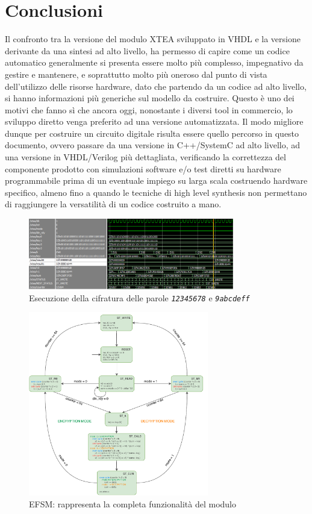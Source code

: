\documentclass[]{IEEEtran}
\newcommand{\code}[1]{\texttt{#1}}
\begin{document}
\section{Conclusioni}
Il confronto tra la versione del modulo XTEA sviluppato in VHDL e la versione derivante da una sintesi ad alto livello, 
ha permesso di capire come un codice automatico generalmente si presenta essere molto pi\`u complesso, impegnativo da 
gestire e mantenere, e soprattutto molto pi\`u oneroso dal punto di vista dell'utilizzo delle risorse hardware, dato che 
partendo da un codice ad alto livello, si hanno informazioni pi\`u generiche sul modello da costruire.
Questo \`e uno dei motivi che fanno s\`i che ancora oggi, nonostante i diversi tool in commercio, lo sviluppo diretto
venga preferito ad una versione automatizzata. Il modo migliore dunque per costruire un circuito digitale risulta essere 
quello percorso in questo documento, ovvero passare da una versione in C++/SystemC ad alto livello, ad una versione in 
VHDL/Verilog pi\`u dettagliata, verificando la correttezza del componente prodotto con simulazioni software e/o test 
diretti su hardware programmabile prima di un eventuale impiego su larga scala costruendo hardware specifico, almeno 
fino a quando le tecniche di high level synthesis non permettano di raggiungere la versatilit\`a di un codice costruito 
a mano.




\begin{figure}[b]
	\centering
	\includegraphics[width=0.8\textwidth]{figures/vhdl_exec}
	\caption{Esecuzione della cifratura delle parole \emph{\code{12345678}} e \emph{\code{9abcdeff}}}
	\label{fig:grafico}
\end{figure}

\begin{figure}[bt]
	\centering
	\includegraphics[width=0.7\textwidth]{figures/efsm.pdf}
	\caption{EFSM: rappresenta la completa funzionalit\`a del modulo}
	\label{fig:efsm}
\end{figure}
\end{document}
